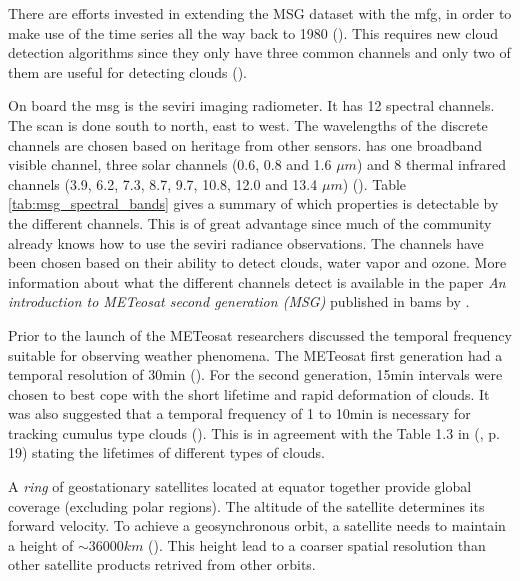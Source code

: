 There are efforts invested in extending the MSG dataset with the \acrfull{mfg}, in order to make use of the time series all the way back to 1980 (\cite{Bojanowski2018PerformanceGenerations}). This requires new cloud detection algorithms since they only have three common channels and only two of them are useful for detecting clouds (\cite{Stockli2019CloudApplications}). 


On board the \acrshort{msg} is the \acrfull{seviri} imaging radiometer. It has 12 spectral channels. The scan is done south to north, east to west. The wavelengths of the discrete channels are chosen based on heritage from other sensors.  has one broadband visible channel, three solar channels (0.6, 0.8 and 1.6 $\mu m$) and 8 thermal infrared channels (3.9, 6.2, 7.3, 8.7, 9.7, 10.8, 12.0 and 13.4 $\mu m$) (\cite{Taravat2015MultilayerMasking}). Table \ref{tab:msg_spectral_bands}
 gives a summary of which properties is detectable by the different channels. 
This is of great advantage since much of the community already knows how to use the \acrshort{seviri} radiance observations. The channels have been chosen based on their ability to detect clouds, water vapor and ozone. More information about what the different channels detect is available in the paper \textit{An introduction to METeosat second generation (MSG)} published in \acrshort{bams} by .

Prior to the launch of the METeosat researchers discussed the temporal frequency suitable for observing weather phenomena. The METeosat first generation had a temporal resolution of 30min (\cite{Stockli2019CloudApplications}). For the second generation, 15min intervals were chosen to best cope with the short lifetime and rapid deformation of clouds. It was also suggested that a temporal frequency of 1 to 10min is necessary for tracking cumulus type clouds (\cite{Schmetz_meteosat_intro}). %
This is in agreement with the Table 1.3 in \citeauthor{lohmann2016} (\citeyear{lohmann2016}, p. 19) stating the lifetimes of different types of clouds.

A \textit{ring} of geostationary satellites located at equator together provide global coverage (excluding polar regions). The altitude of the satellite determines its forward velocity. To achieve a geosynchronous orbit, a satellite needs to maintain a height of $\sim 36 000km$ (\cite{Bley2013ASEVIRI}). This height lead to a coarser spatial resolution than other satellite products retrived from other orbits. 

